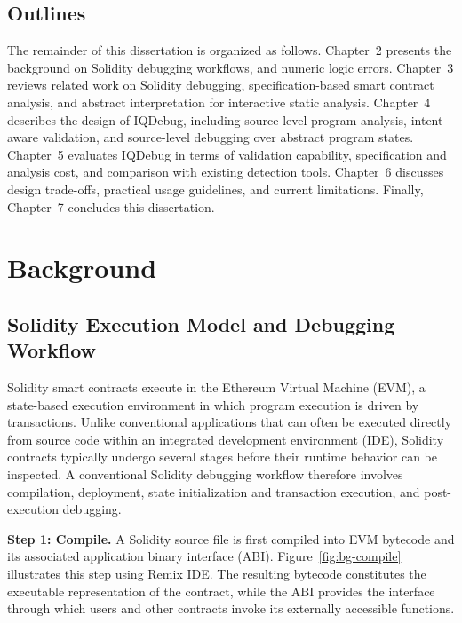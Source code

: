 \documentclass[11pt,oneside]{report}
\theoremstyle{plain}
\theoremstyle{definition}
\theoremstyle{remark}
\begin{document}
\section{Outlines}\label{sec:intro:outline}
The remainder of this dissertation is organized as follows.
Chapter~2 presents the background on Solidity debugging workflows, and numeric logic errors.
Chapter~3 reviews related work on Solidity debugging, specification-based smart contract analysis, and abstract interpretation for interactive static analysis.
Chapter~4 describes the design of IQDebug, including source-level program analysis, intent-aware validation, and source-level debugging over abstract program states.
Chapter~5 evaluates IQDebug in terms of validation capability, specification and analysis cost, and comparison with existing detection tools.
Chapter~6 discusses design trade-offs, practical usage guidelines, and current limitations.
Finally, Chapter~7 concludes this dissertation.

\chapter{Background}\label{chap:background}

\section{Solidity Execution Model and Debugging Workflow}\label{sec:bg:execmodel}

Solidity smart contracts execute in the Ethereum Virtual Machine (EVM), a state-based execution environment in which program execution is driven by transactions.
Unlike conventional applications that can often be executed directly from source code within an integrated development environment (IDE), Solidity contracts typically undergo several stages before their runtime behavior can be inspected.
A conventional Solidity debugging workflow therefore involves compilation, deployment, state initialization and transaction execution, and post-execution debugging.

\smallskip
\noindent\textbf{Step 1: Compile.}
A Solidity source file is first compiled into EVM bytecode and its associated application binary interface (ABI).
Figure~\ref{fig:bg-compile} illustrates this step using Remix IDE.
The resulting bytecode constitutes the executable representation of the contract, while the ABI provides the interface through which users and other contracts invoke its externally accessible functions.
\end{document}
